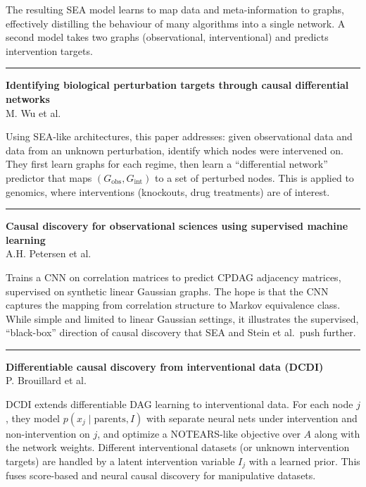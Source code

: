 \documentclass[a5paper]{article}
\begin{document}
The resulting SEA model learns to map data and meta-information to
graphs, effectively distilling the behaviour of many algorithms into a
single network. A second model takes two graphs (observational,
interventional) and predicts intervention targets.

\begin{center}\rule{0.5\linewidth}{0.5pt}\end{center}

\textbf{Identifying biological perturbation targets through causal
differential networks}\\
M. Wu et al.

Using SEA-like architectures, this paper addresses: given observational
data and data from an unknown perturbation, identify which nodes were
intervened on. They first learn graphs for each regime, then learn a
``differential network'' predictor that maps $(G_{\text{obs}},G_{\text{int}})$ to a set of
perturbed nodes. This is applied to genomics, where interventions
(knockouts, drug treatments) are of interest.

\begin{center}\rule{0.5\linewidth}{0.5pt}\end{center}

\textbf{Causal discovery for observational sciences using supervised
machine learning}\\
A.H. Petersen et al.

Trains a CNN on correlation matrices to predict CPDAG adjacency
matrices, supervised on synthetic linear Gaussian graphs. The hope is
that the CNN captures the mapping from correlation structure to Markov
equivalence class. While simple and limited to linear Gaussian settings,
it illustrates the supervised, ``black-box'' direction of causal
discovery that SEA and Stein et al.~push further.

\begin{center}\rule{0.5\linewidth}{0.5pt}\end{center}

\textbf{Differentiable causal discovery from interventional data
(DCDI)}\\
P. Brouillard et al.

DCDI extends differentiable DAG learning to interventional data. For
each node $j$, they model $p(x_j \mid \text{parents}, I)$ with separate
neural nets under intervention and non-intervention on $j$, and optimize a
NOTEARS-like objective over $A$ along with the network weights. Different
interventional datasets (or unknown intervention targets) are handled by
a latent intervention variable $I_j$ with a learned prior. This fuses
score-based and neural causal discovery for manipulative datasets.
\end{document}
